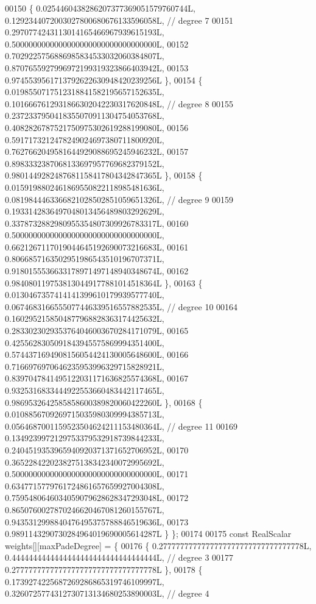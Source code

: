 \begin{DoxyCode}
00150     \{ 0.0254460438286207377369051579760744L, 0.1292344072003027800680676133596058L,  \textcolor{comment}{// degree 7}
00151       0.2970774243113014165466967939615193L, 0.5000000000000000000000000000000000L,
00152       0.7029225756886985834533032060384807L, 0.8707655927996972199319323866403942L,
00153       0.9745539561713792622630948420239256L \},
00154     \{ 0.0198550717512318841582195657152635L, 0.1016667612931866302042230317620848L,  \textcolor{comment}{// degree 8}
00155       0.2372337950418355070911304754053768L, 0.4082826787521750975302619288199080L,
00156       0.5917173212478249024697380711800920L, 0.7627662049581644929088695245946232L,
00157       0.8983332387068133697957769682379152L, 0.9801449282487681158417804342847365L \},
00158     \{ 0.0159198802461869550822118985481636L, 0.0819844463366821028502851059651326L,  \textcolor{comment}{// degree 9}
00159       0.1933142836497048013456489803292629L, 0.3378732882980955354807309926783317L,
00160       0.5000000000000000000000000000000000L, 0.6621267117019044645192690073216683L,
00161       0.8066857163502951986543510196707371L, 0.9180155536633178971497148940348674L,
00162       0.9840801197538130449177881014518364L \},
00163     \{ 0.0130467357414141399610179939577740L, 0.0674683166555077446339516557882535L,  \textcolor{comment}{// degree 10}
00164       0.1602952158504877968828363174425632L, 0.2833023029353764046003670284171079L,
00165       0.4255628305091843945575869994351400L, 0.5744371694908156054424130005648600L,
00166       0.7166976970646235953996329715828921L, 0.8397047841495122031171636825574368L,
00167       0.9325316833444922553660483442117465L, 0.9869532642585858600389820060422260L \},
00168     \{ 0.0108856709269715035980309994385713L, 0.0564687001159523504624211153480364L,  \textcolor{comment}{// degree 11}
00169       0.1349239972129753379532918739844233L, 0.2404519353965940920371371652706952L,
00170       0.3652284220238275138342340072995692L, 0.5000000000000000000000000000000000L,
00171       0.6347715779761724861657659927004308L, 0.7595480646034059079628628347293048L,
00172       0.8650760027870246620467081260155767L, 0.9435312998840476495375788846519636L,
00173       0.9891143290730284964019690005614287L \} \};
00174 
00175   \textcolor{keyword}{const} RealScalar weights[][maxPadeDegree] = \{ 
00176     \{ 0.2777777777777777777777777777777778L, 0.4444444444444444444444444444444444L,  \textcolor{comment}{// degree 3}
00177       0.2777777777777777777777777777777778L \},
00178     \{ 0.1739274225687269286865319746109997L, 0.3260725774312730713134680253890003L,  \textcolor{comment}{// degree 4}

\end{DoxyCode}
